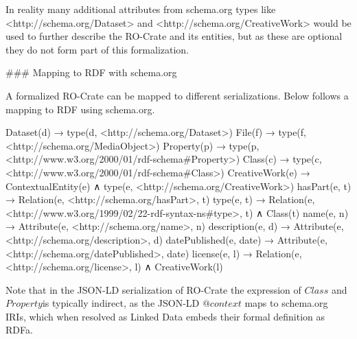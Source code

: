 \begin{markdown}
In reality many additional attributes from schema.org types like <http://schema.org/Dataset> and <http://schema.org/CreativeWork> would be used to further describe the RO-Crate and its entities, but as these are optional they do not form part of this formalization.
\end{markdown}

\begin{markdown}
### Mapping to RDF with schema.org

A formalized RO-Crate can be mapped to different serializations. Below follows a mapping to RDF using schema.org.

    Dataset(d) →  type(d, <http://schema.org/Dataset>)
    File(f) →  type(f, <http://schema.org/MediaObject>)
    Property(p) →  type(p, <http://www.w3.org/2000/01/rdf-schema#Property>)
    Class(c) →  type(c, <http://www.w3.org/2000/01/rdf-schema#Class>)
    CreativeWork(e) →  ContextualEntity(e) ∧ type(e, <http://schema.org/CreativeWork>)
    hasPart(e, t) →  Relation(e, <http://schema.org/hasPart>, t)
    type(e, t) →  Relation(e, <http://www.w3.org/1999/02/22-rdf-syntax-ns#type>, t) ∧ Class(t)
    name(e, n) →  Attribute(e, <http://schema.org/name>, n)
    description(e, d) →  Attribute(e, <http://schema.org/description>, d)
    datePublished(e, date) →  Attribute(e, <http://schema.org/datePublished>, date)
    license(e, l) →  Relation(e, <http://schema.org/license>, l) ∧ CreativeWork(l)

Note that in the JSON-LD serialization of RO-Crate the expression of $Class$ and $Property $is typically indirect, as the JSON-LD $@context$ maps to schema.org IRIs, which when resolved as Linked Data embeds their formal definition as RDFa. 
\end{markdown}

